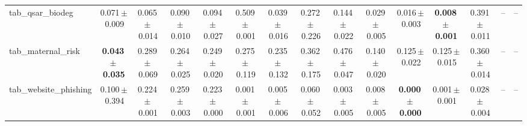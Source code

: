 \documentclass[8pt]{extarticle}
\begin{document}
\begin{longtable}{l*{14}{c}}
tab\_qsar\_biodeg & 0.071\,$\pm$\,0.009 & 0.065\,$\pm$\,0.014 & 0.090\,$\pm$\,0.010 & 0.094\,$\pm$\,0.027 & 0.509\,$\pm$\,0.001 & 0.039\,$\pm$\,0.016 & 0.272\,$\pm$\,0.226 & 0.144\,$\pm$\,0.022 & 0.029\,$\pm$\,0.005 & 0.016\,$\pm$\,0.003 & \textbf{0.008\,$\pm$\,0.001} & 0.391\,$\pm$\,0.011 & -- & -- \\
tab\_maternal\_risk & \textbf{0.043\,$\pm$\,0.035} & 0.289\,$\pm$\,0.069 & 0.264\,$\pm$\,0.025 & 0.249\,$\pm$\,0.020 & 0.275\,$\pm$\,0.119 & 0.235\,$\pm$\,0.132 & 0.362\,$\pm$\,0.175 & 0.476\,$\pm$\,0.047 & 0.140\,$\pm$\,0.020 & 0.125\,$\pm$\,0.022 & 0.125\,$\pm$\,0.015 & 0.360\,$\pm$\,0.014 & -- & -- \\
tab\_website\_phishing & 0.100\,$\pm$\,0.394 & 0.224\,$\pm$\,0.001 & 0.259\,$\pm$\,0.003 & 0.223\,$\pm$\,0.000 & 0.001\,$\pm$\,0.001 & 0.005\,$\pm$\,0.006 & 0.060\,$\pm$\,0.052 & 0.003\,$\pm$\,0.005 & 0.008\,$\pm$\,0.005 & \textbf{0.000\,$\pm$\,0.000} & 0.001\,$\pm$\,0.001 & 0.028\,$\pm$\,0.004 & -- & -- \\
\end{longtable}
\end{document}
